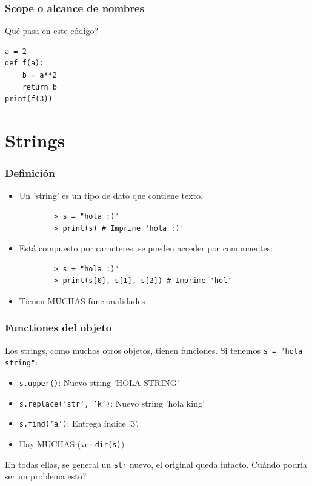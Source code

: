 \documentclass[14pt,aspectratio=169,xcolor=dvipsnames]{beamer}
\begin{document}
\begin{frame}[fragile]\frametitle{Scope o alcance de nombres}
Qué pasa en este código?

\begin{verbatim}
a = 2
def f(a):
    b = a**2
    return b
print(f(3))
\end{verbatim}

\end{frame}
\section{Strings}
\begin{frame}[t,fragile]\frametitle{Definición}
    \begin{itemize} 
        \item<1-> Un 'string' es un tipo de dato que contiene texto. 
            \begin{verbatim}
        > s = "hola :)"
        > print(s) # Imprime 'hola :)'
            \end{verbatim}
        \item<2-> Está compuesto por caracteres, se pueden acceder por componentes: 
            \begin{verbatim}
        > s = "hola :)"
        > print(s[0], s[1], s[2]) # Imprime 'hol'
            \end{verbatim}
        \item<3-> Tienen MUCHAS funcionalidades
    \end{itemize}
\end{frame}
\begin{frame}\frametitle{Functiones del objeto}
    Los strings, como muchos otros objetos, tienen funciones. Si tenemos \texttt{s = "hola string"}:
    \begin{itemize}
        \item \texttt{s.upper()}: Nuevo string 'HOLA STRING'
        \item \texttt{s.replace('str', 'k')}: Nuevo string 'hola king'
        \item \texttt{s.find('a')}: Entrega índice '3'.
        \item Hay MUCHAS (ver \texttt{dir(s)})
    \end{itemize}

En todas ellas, se general un \texttt{str} nuevo, el original queda intacto. Cuándo podría ser un problema esto? 
\end{frame}
\end{document}
